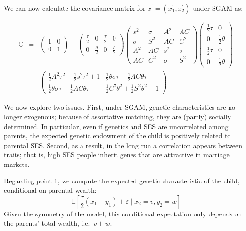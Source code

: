 \documentclass[
]{article}
\theoremstyle{definition}
\theoremstyle{definition}
\theoremstyle{definition}
\theoremstyle{definition}
\theoremstyle{remark}
\begin{document}
We can now calculate the covariance matrix for
\(x^\prime = (x_{1}^{\prime }, x_{2}^{\prime })\) under SGAM as:

\begin{eqnarray}
\mathbb{C} &=&\left( 
\begin{array}{cc}
1 & 0 \\ 
0 & 1%
\end{array}%
\right) +\left( 
\begin{array}{cccc}
\frac{\tau }{2} & 0 & \frac{\tau }{2} & 0 \\ 
0 & \frac{\theta }{2} & 0 & \frac{\theta }{2}%
\end{array}%
\right) \allowbreak \left( 
\begin{array}{cccc}
s^{2} & \sigma  & A^{2} & AC \\ 
\sigma  & S^{2} & AC & C^{2} \\ 
A^{2} & AC & s^{2} & \sigma  \\ 
AC & C^{2} & \sigma  & S^{2}%
\end{array}%
\right) \allowbreak \left( 
\begin{array}{cc}
\frac{1}{2}\tau  & 0 \\ 
0 & \frac{1}{2}\theta  \\ 
\frac{1}{2}\tau  & 0 \\ 
0 & \frac{1}{2}\theta 
\end{array}%
\right) \nonumber \\
&=&\left( 
\begin{array}{cc}
\frac{1}{2}A^{2}\tau ^{2}+\frac{1}{2}s^{2}\tau ^{2}+1 & \frac{1}{2}\theta
\sigma \tau +\frac{1}{2}AC\theta \tau  \\ 
\frac{1}{2}\theta \sigma \tau +\frac{1}{2}AC\theta \tau  & \frac{1}{2}%
C^{2}\theta ^{2}+\frac{1}{2}S^{2}\theta ^{2}+1%
\end{array}%
\right) \allowbreak \label{cov-children-SGAM}
\end{eqnarray}
\newline

We now explore two issues. First, under SGAM, genetic characteristics are no
longer exogenous; because of assortative matching, they are (partly) socially
determined. In particular, even if genetics and SES are uncorrelated among
parents, the expected genetic endowment of the child is positively related to
parental SES. Second, as a result, in the long run a correlation appears between
traits; that is, high SES people inherit genes that are attractive in marriage
markets.

Regarding point 1, we compute the expected genetic characteristic of the
child, conditional on parental wealth:
\[
\mathbb{E}\left[ \frac{\tau }{2}\left( x_{1}+y_{1}\right) +\varepsilon \mid
x_{2}=v,y_{2}=w\right] 
\]
Given the symmetry of the model, this conditional
expectation only depends on the parents' total wealth, i.e.~\(v+w\).
\end{document}
